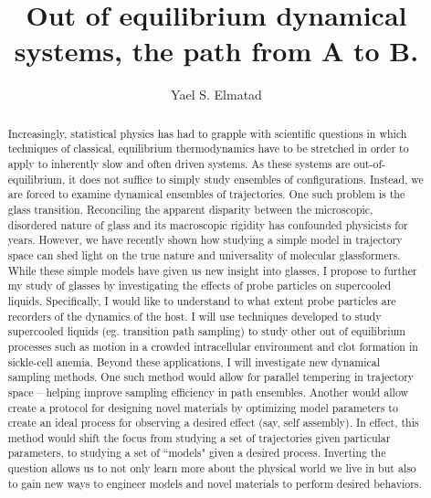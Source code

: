 \documentclass[11pt]{article}
\title{{Out of equilibrium dynamical systems, the path from A to B.}}
\author{Yael S. Elmatad}
\date{}                                           %
\begin{document}
\maketitle
%
\begin{abstract}
Increasingly, statistical physics has had to grapple with scientific questions in which techniques of classical, equilibrium thermodynamics have to be stretched in order to apply to inherently slow and often driven systems.   As these systems are out-of-equilibrium, it does not suffice to simply study ensembles of configurations. Instead, we are forced to examine dynamical ensembles of trajectories.  One such problem is the glass transition.  Reconciling the apparent disparity between the microscopic, disordered nature of glass and its macroscopic rigidity has confounded physicists for years. However, we have recently shown how studying a simple model in trajectory space can shed light on the true nature and universality of molecular glassformers.  While these simple models have given us new insight into glasses, I propose to further my study of glasses by investigating the effects of probe particles on supercooled liquids.  Specifically, I would like to understand to what extent probe particles are recorders of the dynamics of the host.  I will use techniques developed to study supercooled liquids (eg. transition path sampling) to study other out of equilibrium processes such as motion in a crowded intracellular environment and clot formation in sickle-cell anemia.  Beyond these applications, I will investigate new dynamical sampling methods.  One such method would allow for parallel tempering in trajectory space -- helping improve sampling efficiency in path ensembles.  Another would allow create a protocol for designing novel materials by optimizing model parameters to create an ideal process for observing a desired effect (say, self assembly).  In effect, this method would shift the focus from studying a set of trajectories given particular parameters, to studying a set of ``models" given a desired process. Inverting the question allows us to not only learn more about the physical world we live in but also to gain new ways to engineer models and novel materials to perform desired behaviors.



\end{abstract}
\end{document}
